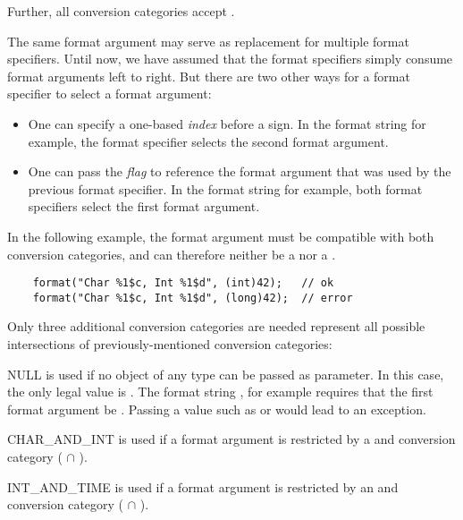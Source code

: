 \noindent Further, all conversion categories accept .

\noindent The same format argument may serve as replacement for multiple format specifiers. 
Until now, we have assumed that the format specifiers simply consume format arguments left to right.
But there are two other ways for a format specifier to select a format argument:

\begin{itemize}
\item One can specify a one-based \emph{index} before a \code{\$} sign. In the
    format string  for example, the format specifier selects the
    second format argument.  
\item One can pass the \code{<} \emph{flag} to reference the format argument
    that was used by the previous format specifier. In the format string
     for example, both format specifiers select the first
    format argument.
\end{itemize}

In the following example,
the format argument must be compatible with both conversion
categories, and can therefore neither be a  nor a .

\begin{Verbatim}
    format("Char %1$c, Int %1$d", (int)42);   // ok
    format("Char %1$c, Int %1$d", (long)42);  // error
\end{Verbatim}
 
Only three additional conversion categories are needed represent all possible
intersections of previously-mentioned conversion categories:

\begin{description}
\item{NULL} is used if no object of any type can be
    passed as parameter. In this case, the only legal value is .
    The format string , for example requires that the first
    format argument be .  Passing a value such as  or
     would lead to an exception.
\item{CHAR\_AND\_INT} is used if a format argument is restricted by a  and  conversion category ( $\cap$ ).
\item{INT\_AND\_TIME} is used if a format argument is restricted by an  and  conversion category ( $\cap$ ).
\end{description}

